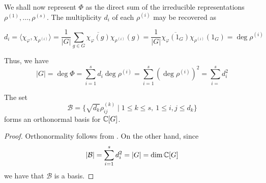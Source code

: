 We shall now represent $\Phi$ as the direct sum of the irreducible representations $\rho^{(1)},\ldots,\rho^{(s)}$. The multiplicity $d_i$ of each $\rho^{(i)}$ may be recovered as 

\begin{equation*}
    d_i = \langle\chi_\varphi,\chi_{\rho^{(i)}}\rangle = \frac{1}{|G|}\sum_{g\in G}\overline{\chi_\varphi(g)}\chi_{\rho^{(i)}}(g) = \frac{1}{|G|}\overline{\chi_\varphi(1_G)}\chi_{\rho^{(i)}}(1_G) = \deg\rho^{(i)}
\end{equation*}

Thus, we have 
\begin{equation*}
    |G| = \deg\Phi = \sum_{i = 1}^s d_i\deg\rho^{(i)} = \sum_{i = 1}^s(\deg\rho^{(i)})^2 = \sum_{i = }^s d_i^2
\end{equation*}

\begin{lemma}
    The set 
    \begin{equation*}
        \mathcal B = \{\sqrt{d_k}\rho_{ij}^{(k)}\mid 1\le k\le s,~1\le i,j\le d_k\}
    \end{equation*}
    forms an orthonormal basis for $\mathbb{C}[G]$.
\end{lemma}
\begin{proof}
    Orthonormality follows from . On the other hand, since 
    \begin{equation*}
        |\mathcal B| = \sum_{i = 1}^s d_i^2 = |G| = \dim\mathbb{C}[G]
    \end{equation*}
    we have that $\mathcal B$ is a basis.
\end{proof}

